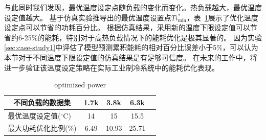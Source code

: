 与此同时我们发现，最优温度设定点随负载的变化而变化。热负载越大，最优温度设定值越大。
基于仿真实验推导出的最优温度设置点$Ti^*_{\min}$，表~\ref{tab:power_save_percent}展示了优化温度设定点可以节省的功耗百分比。
根据仿真结果，采用新的温度下限设定值可以节省约6-25\%的能耗，特别对于高热负载情况下的能耗优化是极其显著的。
因为实验\ref{sec:case-study1}中评估了模型预测累积能耗的相对百分比误差小于5\%，可以认为本节对于不同温度下限设定值的仿真结果是有足够可信度。
在未来的工作中，将进一步验证该温度设定策略在实际工业制冷系统中的能耗优化表现。


\begin{table}[]
\centering
\caption{optimized power}
\label{tab:power_save_percent}
\begin{tabular}{lcccc}
\hline
\multicolumn{1}{c}{\textbf{不同负载的数据集}} & 1.7k  & 3.8k    & 6.3k  \\ \hline
最优温度设定值(${ }^{\circ} \mathrm{C}$)               & 14   & 15     & 15.5    \\
最大功耗优化比例(\%)              & 6.49 & 10.93  & 25.71\\ \hline
\end{tabular}
\end{table}







